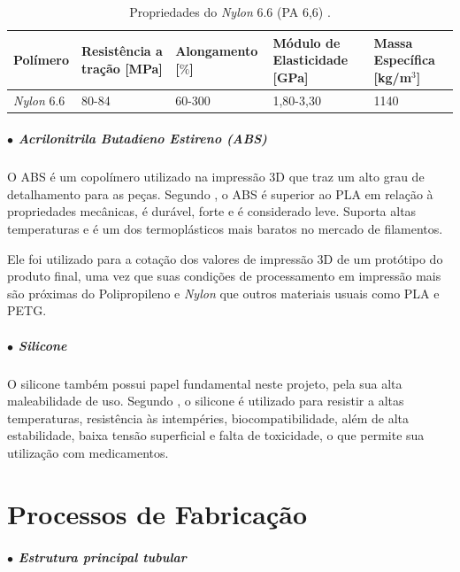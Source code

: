 \begin{table}[H]
    \centering
    \caption{Propriedades do \textit{Nylon} 6.6 (PA 6,6) \cite{mechanicalPolymers}.}
    \label{tab:PropPA6}
    \begin{adjustbox}{max width = \textwidth}
        \begin{tabular}{|C{2cm}|C{3cm}|C{3cm}|C{3cm}|C{2.5cm}|}
            \hline
            \textbf{Polímero} & \textbf{Resistência a tração [MPa]} & \textbf{Alongamento [$\%$] } & \textbf{Módulo de Elasticidade [GPa]} & \textbf{Massa Específica [kg/m$^3$]} \\ \hline
            
              \textit{Nylon} 6.6 & 80-84 & 60-300 & 1,80-3,30 & 1140
             \\ \hline
        \end{tabular}
    \end{adjustbox}
\end{table}

\subparagraph*{$\bullet$ Acrilonitrila Butadieno Estireno (ABS)}\hfill

O ABS é um copolímero utilizado na impressão 3D que traz um alto grau de detalhamento para as peças. Segundo \cite{Imp3D_Polimeros}, o ABS é superior ao PLA em relação à propriedades mecânicas, é durável, forte e é considerado leve. Suporta altas temperaturas e é um dos termoplásticos mais baratos no mercado de filamentos.

Ele foi utilizado para a cotação dos valores de impressão 3D de um protótipo do produto final, uma vez que suas condições de processamento em impressão mais são próximas do Polipropileno e \textit{Nylon} que outros materiais usuais como PLA e PETG.

\subparagraph*{$\bullet$ Silicone} \hfill

O silicone também possui papel fundamental neste projeto, pela sua alta maleabilidade de uso. Segundo \cite{Silicone_estudo}, o silicone é utilizado para resistir a altas temperaturas, resistência às intempéries, biocompatibilidade, além de alta estabilidade, baixa tensão superficial e falta de toxicidade, o que permite sua utilização com medicamentos.

\section{Processos de Fabricação} 
\label{section:fabricacao}

\subparagraph*{$\bullet$ Estrutura principal tubular} \hfill

